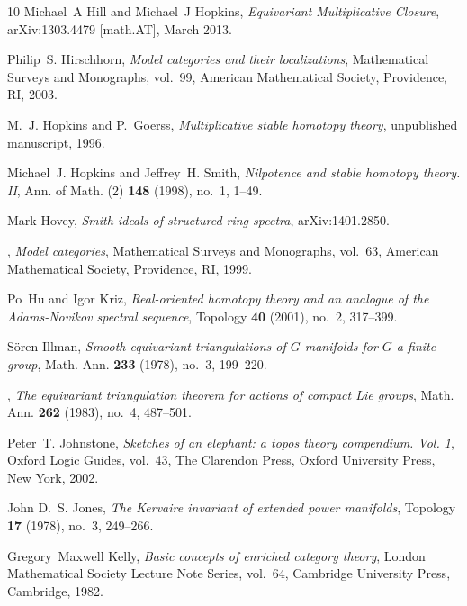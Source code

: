 \documentclass{amsart}
\theoremstyle{definition}
\theoremstyle{remark}
\begin{document}
\begin{thebibliography}{10}
Michael~A Hill and Michael~J Hopkins, \emph{{Equivariant Multiplicative
  Closure}}, arXiv:1303.4479 [math.AT], March 2013.

Philip~S. Hirschhorn, \emph{Model categories and their localizations},
  Mathematical Surveys and Monographs, vol.~99, American Mathematical Society,
  Providence, RI, 2003. 

M.~J. Hopkins and P.~Goerss, \emph{Multiplicative stable homotopy theory},
  unpublished manuscript, 1996.

Michael~J. Hopkins and Jeffrey~H. Smith, \emph{Nilpotence and stable homotopy
  theory. {I}{I}}, Ann. of Math. (2) \textbf{148} (1998), no.~1, 1--49.

Mark Hovey, \emph{Smith ideals of structured ring spectra}, arXiv:1401.2850.

\bysame, \emph{Model categories}, Mathematical Surveys and Monographs, vol.~63,
  American Mathematical Society, Providence, RI, 1999. 

Po~Hu and Igor Kriz, \emph{Real-oriented homotopy theory and an analogue of the
  {A}dams-{N}ovikov spectral sequence}, Topology \textbf{40} (2001), no.~2,
  317--399. 

S{\"o}ren Illman, \emph{Smooth equivariant triangulations of {$G$}-manifolds
  for {$G$} a finite group}, Math. Ann. \textbf{233} (1978), no.~3, 199--220.

\bysame, \emph{The equivariant triangulation theorem for actions of compact
  {L}ie groups}, Math. Ann. \textbf{262} (1983), no.~4, 487--501. 

Peter~T. Johnstone, \emph{Sketches of an elephant: a topos theory compendium.
  {V}ol. 1}, Oxford Logic Guides, vol.~43, The Clarendon Press, Oxford
  University Press, New York, 2002. 

John D.~S. Jones, \emph{The {K}ervaire invariant of extended power manifolds},
  Topology \textbf{17} (1978), no.~3, 249--266. 

Gregory~Maxwell Kelly, \emph{Basic concepts of enriched category theory},
  London Mathematical Society Lecture Note Series, vol.~64, Cambridge
  University Press, Cambridge, 1982. 


\end{thebibliography}
\end{document}
